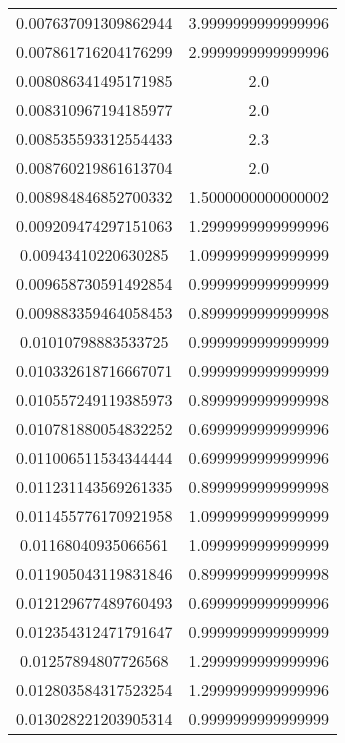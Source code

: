 \begin{table}
\begin{tabular}{S[]S[]}
0.007637091309862944 & 3.9999999999999996\\
0.007861716204176299 & 2.9999999999999996\\
0.008086341495171985 & 2.0\\
0.008310967194185977 & 2.0\\
0.008535593312554433 & 2.3\\
0.008760219861613704 & 2.0\\
0.008984846852700332 & 1.5000000000000002\\
0.009209474297151063 & 1.2999999999999996\\
0.00943410220630285 & 1.0999999999999999\\
0.009658730591492854 & 0.9999999999999999\\
0.009883359464058453 & 0.8999999999999998\\
0.01010798883533725 & 0.9999999999999999\\
0.010332618716667071 & 0.9999999999999999\\
0.010557249119385973 & 0.8999999999999998\\
0.010781880054832252 & 0.6999999999999996\\
0.011006511534344444 & 0.6999999999999996\\
0.011231143569261335 & 0.8999999999999998\\
0.011455776170921958 & 1.0999999999999999\\
0.01168040935066561 & 1.0999999999999999\\
0.011905043119831846 & 0.8999999999999998\\
0.012129677489760493 & 0.6999999999999996\\
0.012354312471791647 & 0.9999999999999999\\
0.01257894807726568 & 1.2999999999999996\\
0.012803584317523254 & 1.2999999999999996\\
0.013028221203905314 & 0.9999999999999999\\
\bottomrule
\end{tabular}\end{table}